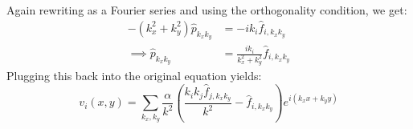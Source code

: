 \documentclass[reqno]{article}
\begin{document}
	Again rewriting as a Fourier series and using the orthogonality condition, we get:
	\begin{equation} \label{eq:p-fourier-components}
	\begin{split}
	-\left( k_x^2 + k_y^2 \right) \hat{p}_{k_x k_y}
	&= -i k_i \hat{f}_{i, k_x k_y} \\
	\implies \hat{p}_{k_x k_y}
	&= \frac{ i k_i }{ k_x^2 + k_y^2 } \hat{f}_{i, k_x k_y}
	\end{split}
	\end{equation}
	Plugging this back into the original equation yields:
	\begin{equation} \label{eq:velocity-fourier-solution}
	v_i(x, y) 
	= \sum_{k_x, k_y} \frac{ \alpha }{ k^2 } \left(
	\frac{ k_i k_j \hat{f}_{j, k_x k_y} }{k^2}
	- \hat{f}_{i, k_x k_y}
	\right)
	e^{ i \left( k_x x + k_y y \right) }
	\end{equation}
	
\end{document}
